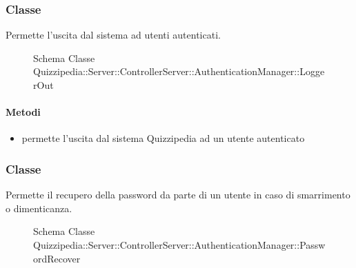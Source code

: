 \subsubsection{Classe }
Permette l'uscita dal sistema ad utenti autenticati.
\begin{figure}[H]
\centering
\noindent{}
\caption[Schema Classe LoggerOut]{Schema Classe Quizzipedia::Server::ControllerServer::AuthenticationManager::LoggerOut}
\end{figure}
\paragraph{Metodi}
\begin{itemize}
\item {}
\newline
permette l'uscita dal sistema Quizzipedia ad un utente autenticato
\newline
\end{itemize}
\subsubsection{Classe }
Permette il recupero della password da parte di un utente in caso di smarrimento o dimenticanza.
\begin{figure}[H]
\centering
\noindent{}
\caption[Schema Classe PasswordRecover]{Schema Classe Quizzipedia::Server::ControllerServer::AuthenticationManager::PasswordRecover}
\end{figure}
